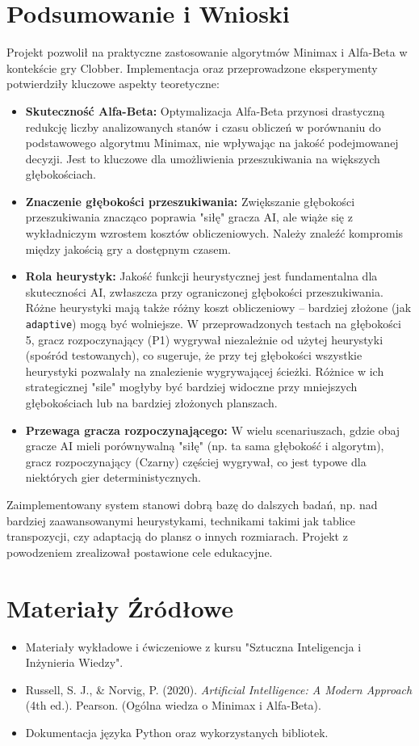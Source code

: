 \documentclass[11pt,a4paper]{article}
\newcommand{\code}[1]{\texttt{#1}} %
\begin{document}
\section{Podsumowanie i Wnioski}
Projekt pozwolił na praktyczne zastosowanie algorytmów Minimax i Alfa-Beta w kontekście gry Clobber. Implementacja oraz przeprowadzone eksperymenty potwierdziły kluczowe aspekty teoretyczne:
\begin{itemize}
    \item \textbf{Skuteczność Alfa-Beta:} Optymalizacja Alfa-Beta przynosi drastyczną redukcję liczby analizowanych stanów i czasu obliczeń w porównaniu do podstawowego algorytmu Minimax, nie wpływając na jakość podejmowanej decyzji. Jest to kluczowe dla umożliwienia przeszukiwania na większych głębokościach.
    \item \textbf{Znaczenie głębokości przeszukiwania:} Zwiększanie głębokości przeszukiwania znacząco poprawia "siłę" gracza AI, ale wiąże się z wykładniczym wzrostem kosztów obliczeniowych. Należy znaleźć kompromis między jakością gry a dostępnym czasem.
    \item \textbf{Rola heurystyk:} Jakość funkcji heurystycznej jest fundamentalna dla skuteczności AI, zwłaszcza przy ograniczonej głębokości przeszukiwania. Różne heurystyki mają także różny koszt obliczeniowy – bardziej złożone (jak \code{adaptive}) mogą być wolniejsze. W przeprowadzonych testach na głębokości 5, gracz rozpoczynający (P1) wygrywał niezależnie od użytej heurystyki (spośród testowanych), co sugeruje, że przy tej głębokości wszystkie heurystyki pozwalały na znalezienie wygrywającej ścieżki. Różnice w ich strategicznej "sile" mogłyby być bardziej widoczne przy mniejszych głębokościach lub na bardziej złożonych planszach.
    \item \textbf{Przewaga gracza rozpoczynającego:} W wielu scenariuszach, gdzie obaj gracze AI mieli porównywalną "siłę" (np. ta sama głębokość i algorytm), gracz rozpoczynający (Czarny) częściej wygrywał, co jest typowe dla niektórych gier deterministycznych.
\end{itemize}
Zaimplementowany system stanowi dobrą bazę do dalszych badań, np. nad bardziej zaawansowanymi heurystykami, technikami takimi jak tablice transpozycji, czy adaptacją do plansz o innych rozmiarach. Projekt z powodzeniem zrealizował postawione cele edukacyjne.

\section*{Materiały Źródłowe}
\begin{itemize}
    \item Materiały wykładowe i ćwiczeniowe z kursu "Sztuczna Inteligencja i Inżynieria Wiedzy".
    \item Russell, S. J., \& Norvig, P. (2020). \textit{Artificial Intelligence: A Modern Approach} (4th ed.). Pearson. (Ogólna wiedza o Minimax i Alfa-Beta). %
    \item Dokumentacja języka Python oraz wykorzystanych bibliotek.
\end{itemize}
\end{document}
